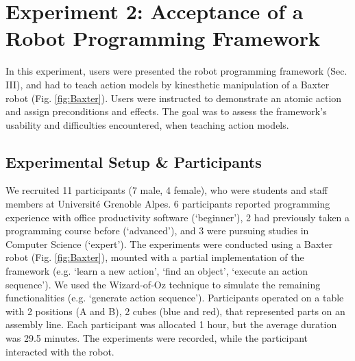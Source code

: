 \section{Experiment 2: Acceptance of a Robot Programming Framework}

\label{sec:Exp2}

In this experiment, users were presented the robot programming framework (Sec. III), and had to teach action models by kinesthetic manipulation of a Baxter robot (Fig. \ref{fig:Baxter}). Users were instructed to demonstrate an atomic action and assign preconditions and effects. The goal was to assess the framework's usability and difficulties encountered, when teaching action models.

\subsection{Experimental Setup \& Participants}
We recruited 11 participants (7 male, 4 female), who were students and staff members at Universit\'{e} Grenoble Alpes. 6 participants reported programming experience with office productivity software (`beginner'), 2 had previously taken a programming course before (`advanced'), and 3 were pursuing studies in Computer Science (`expert').
The experiments were conducted using a Baxter robot (Fig. \ref{fig:Baxter}), mounted with a partial implementation of the framework (e.g. `learn a new action', `find an object', `execute an action sequence'). We used the Wizard-of-Oz technique to simulate the remaining functionalities (e.g. `generate action sequence').
Participants operated on a table with 2 positions (A and B), 2 cubes (blue and red), that represented parts on an assembly line. 
Each participant was allocated 1 hour, but the average duration was 29.5 minutes. The experiments were recorded, while the participant interacted with the robot. 

 
